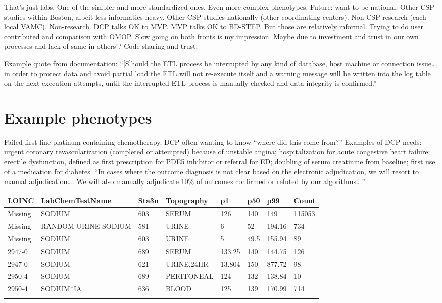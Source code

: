 \documentclass{tufte-handout}
\begin{document}
That's just labs. One of the simpler and more standardized ones. Even
more complex phenotypes. Future: want to be national. Other CSP
studies within Boston, albeit less informatics heavy. Other CSP
studies nationally (other coordinating centers). Non-CSP research
(each local VAMC). Non-research. DCP talks OK to MVP. MVP talks OK to
BD-STEP. But those are relatively informal. Trying to do user
contributed and comparison with OMOP. Slow going on both fronts is my
impression. Maybe due to investment and trust in our own processes and
lack of same in others'? Code sharing and trust.

Example quote from documentation: ``[S]hould the ETL process be
interrupted by any kind of database, host machine or connection
issue\ldots{}, in order to protect data and avoid partial load the ETL
will not re-execute itself and a warning message will be written into
the log table on the next execution attempts, until the interrupted
ETL process is manually checked and data integrity is confirmed.''


\section{Example phenotypes}


Failed first line platinum containing chemotherapy. DCP often wanting
to know ``where did this come from?'' Examples of DCP needs: urgent
coronary revascularization (completed or attempted) because of
unstable angina; hospitalization for acute congestive heart failure;
erectile dysfunction, defined as first prescription for PDE5 inhibitor
or referral for ED; doubling of serum creatinine from baseline; first
use of a medication for diabetes. ``In cases where the outcome
diagnosis is not clear based on the electronic adjudication, we will
resort to manual adjudication\ldots{}. We will also manually adjudicate
10\% of outcomes confirmed or refuted by our algorithms\ldots{}.''

\noindent \begin{tabular}{llllllll}
\\
\hline
LOINC & LabChemTestName & Sta3n & Topography & p1 & p50 & p99 & Count\\
\hline
Missing & SODIUM & 603 & SERUM & 126 & 140 & 149 & 115053\\
Missing & RANDOM URINE SODIUM & 581 & URINE & 6 & 52 & 194.16 & 734\\
Missing & SODIUM & 603 & URINE & 5 & 49.5 & 155.94 & 89\\
2947-0 & SODIUM & 689 & SERUM & 133.25 & 140 & 144.75 & 126\\
2947-0 & SODIUM & 621 & URINE,24HR & 13.804 & 150 & 877.72 & 98\\
2950-4 & SODIUM & 689 & PERITONEAL & 124 & 132 & 138.84 & 10\\
2950-4 & SODIUM*IA & 636 & BLOOD & 125 & 139 & 170.99 & 714\\
\hline
\\
\end{tabular}
\end{document}
